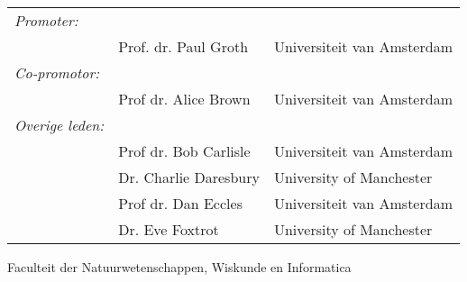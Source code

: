 \begin{tabular}{lll}
\textit{Promoter:}  &  & \\
     & Prof. dr. Paul Groth     & Universiteit van Amsterdam \\
\textit{Co-promotor:} & & \\     
     &  Prof dr. Alice Brown    & Universiteit van Amsterdam \\
\textit{Overige leden:} & & \\
     &  Prof dr. Bob Carlisle   & Universiteit van Amsterdam \\
     &  Dr. Charlie Daresbury   & University of Manchester  \\     
     &  Prof dr. Dan Eccles     & Universiteit van Amsterdam \\
     &  Dr. Eve Foxtrot         & University of Manchester  \\     
\end{tabular}

Faculteit der Natuurwetenschappen, Wiskunde en Informatica
